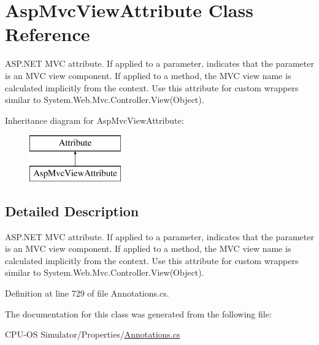 \hypertarget{class_asp_mvc_view_attribute}{}\section{Asp\+Mvc\+View\+Attribute Class Reference}
\label{class_asp_mvc_view_attribute}


A\+S\+P.\+N\+E\+T M\+V\+C attribute. If applied to a parameter, indicates that the parameter is an M\+V\+C view component. If applied to a method, the M\+V\+C view name is calculated implicitly from the context. Use this attribute for custom wrappers similar to {\ttfamily System.\+Web.\+Mvc.\+Controller.\+View(\+Object)}.  


Inheritance diagram for Asp\+Mvc\+View\+Attribute\+:\begin{figure}[H]
\begin{center}
\leavevmode
\includegraphics[height=2.000000cm]{class_asp_mvc_view_attribute}
\end{center}
\end{figure}


\subsection{Detailed Description}
A\+S\+P.\+N\+E\+T M\+V\+C attribute. If applied to a parameter, indicates that the parameter is an M\+V\+C view component. If applied to a method, the M\+V\+C view name is calculated implicitly from the context. Use this attribute for custom wrappers similar to {\ttfamily System.\+Web.\+Mvc.\+Controller.\+View(\+Object)}. 



Definition at line 729 of file Annotations.\+cs.



The documentation for this class was generated from the following file\+:\begin{DoxyCompactItemize}
\item 
C\+P\+U-\/\+O\+S Simulator/\+Properties/\hyperlink{_annotations_8cs}{Annotations.\+cs}\end{DoxyCompactItemize}
